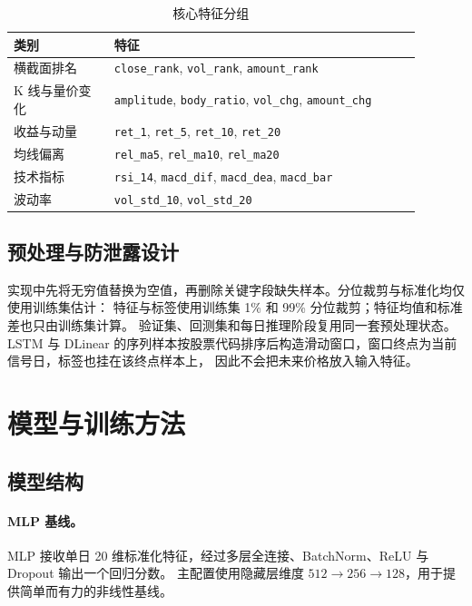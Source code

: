\documentclass[UTF8,a4paper,11pt]{ctexart}
\begin{document}
\begin{table}[H]
\centering
\caption{核心特征分组}\label{tab:features}
\begin{tabular}{p{0.22\linewidth}p{0.67\linewidth}}
\toprule
类别 & 特征 \\
\midrule
横截面排名 & \texttt{close\_rank}, \texttt{vol\_rank}, \texttt{amount\_rank} \\
K 线与量价变化 & \texttt{amplitude}, \texttt{body\_ratio}, \texttt{vol\_chg}, \texttt{amount\_chg} \\
收益与动量 & \texttt{ret\_1}, \texttt{ret\_5}, \texttt{ret\_10}, \texttt{ret\_20} \\
均线偏离 & \texttt{rel\_ma5}, \texttt{rel\_ma10}, \texttt{rel\_ma20} \\
技术指标 & \texttt{rsi\_14}, \texttt{macd\_dif}, \texttt{macd\_dea}, \texttt{macd\_bar} \\
波动率 & \texttt{vol\_std\_10}, \texttt{vol\_std\_20} \\
\bottomrule
\end{tabular}
\end{table}

\subsection{预处理与防泄露设计}

实现中先将无穷值替换为空值，再删除关键字段缺失样本。分位裁剪与标准化均仅使用训练集估计：
特征与标签使用训练集 1\% 和 99\% 分位裁剪；特征均值和标准差也只由训练集计算。
验证集、回测集和每日推理阶段复用同一套预处理状态。
LSTM 与 DLinear 的序列样本按股票代码排序后构造滑动窗口，窗口终点为当前信号日，标签也挂在该终点样本上，
因此不会把未来价格放入输入特征。

\section{模型与训练方法}

\subsection{模型结构}

\paragraph{MLP 基线。}
MLP 接收单日 20 维标准化特征，经过多层全连接、BatchNorm、ReLU 与 Dropout 输出一个回归分数。
主配置使用隐藏层维度 $512\rightarrow256\rightarrow128$，用于提供简单而有力的非线性基线。
\end{document}
